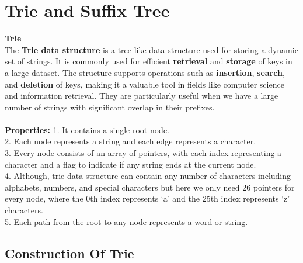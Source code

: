 \documentclass[11pt,a4paper]{article}
\begin{document}

\section{Trie and Suffix Tree}
\textbf{Trie}
\label{sec:introduction}
\\
The \textbf{\textbf{Trie data structure}} is a tree-like data structure used for storing a dynamic set of strings. It is commonly used for efficient \textbf{\textbf{retrieval }}and \textbf{\textbf{storage }}of keys in a large dataset. The structure supports operations such as \textbf{\textbf{insertion}}, \textbf{\textbf{search}}, and \textbf{\textbf{deletion }}of keys, making it a valuable tool in fields like computer science and information retrieval. They are particularly useful when we have a large number of strings with significant overlap in their prefixes.
\\
\\
\textbf{Properties:} 1. It contains a single root node.
\\
2. Each node represents a string and each edge represents a character.
\\
3. Every node consists of an array of pointers, with each index representing a character and a flag to indicate if any string ends at the current node.
\\
4. Although, trie data structure can contain any number of characters including alphabets, numbers, and special characters but here we only need 26 pointers for every node, where the 0th index represents ‘a’ and the 25th index represents ‘z’ characters.
\\
5. Each path from the root to any node represents a word or string.
\\

\subsection{Construction Of Trie}
\end{document}

